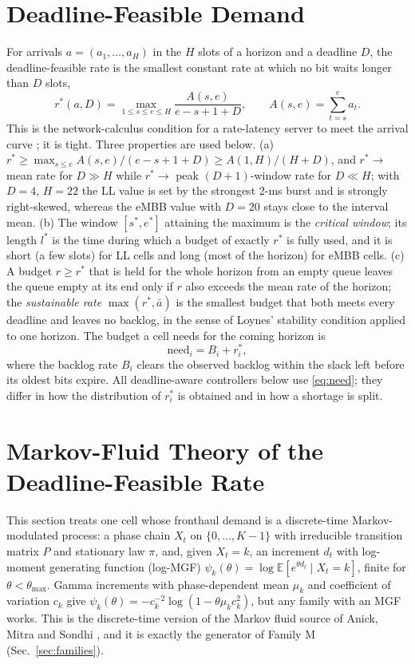 \documentclass[journal]{IEEEtran}
\newcommand{\rstar}{r^{\ast}}
\newcommand{\E}{\mathbb{E}}
\begin{document}
\section{Deadline-Feasible Demand}
\label{sec:demand}
For arrivals $a = (a_1, \dots, a_H)$ in the $H$ slots of a horizon and a deadline $D$, the deadline-feasible rate is the smallest constant rate at which no bit waits longer than $D$ slots,
\begin{equation}
\rstar(a, D) = \max_{1 \le s \le e \le H} \frac{A(s, e)}{e - s + 1 + D}, \qquad A(s, e) = \sum_{t = s}^{e} a_t .
\label{eq:rstar}
\end{equation}
This is the network-calculus condition for a rate-latency server to meet the arrival curve \cite{leboudec2001}; it is tight. Three properties are used below. (a) $\rstar \ge \max_{s \le e} A(s, e)/(e - s + 1 + D) \ge A(1, H)/(H + D)$, and $\rstar \to$ mean rate for $D \gg H$ while $\rstar \to$ peak $(D{+}1)$-window rate for $D \ll H$; with $D = 4$, $H = 22$ the LL value is set by the strongest 2-ms burst and is strongly right-skewed, whereas the eMBB value with $D = 20$ stays close to the interval mean. (b) The window $[s^\ast, e^\ast]$ attaining the maximum is the \emph{critical window}; its length $l^\ast$ is the time during which a budget of exactly $\rstar$ is fully used, and it is short (a few slots) for LL cells and long (most of the horizon) for eMBB cells. (c) A budget $r \ge \rstar$ that is held for the whole horizon from an empty queue leaves the queue empty at its end only if $r$ also exceeds the mean rate of the horizon; the \emph{sustainable rate} $\max(\rstar, \bar a)$ is the smallest budget that both meets every deadline and leaves no backlog, in the sense of Loynes' stability condition \cite{loynes1962} applied to one horizon. The budget a cell needs for the coming horizon is
\begin{equation}
\text{need}_i = B_i + \rstar_i ,
\label{eq:need}
\end{equation}
where the backlog rate $B_i$ clears the observed backlog within the slack left before its oldest bits expire. All deadline-aware controllers below use \eqref{eq:need}; they differ in how the distribution of $\rstar_i$ is obtained and in how a shortage is split.

\section{Markov-Fluid Theory of the Deadline-Feasible Rate}
\label{sec:theory}
This section treats one cell whose fronthaul demand is a discrete-time Markov-modulated process: a phase chain $X_t$ on $\{0, \dots, K-1\}$ with irreducible transition matrix $P$ and stationary law $\pi$, and, given $X_t = k$, an increment $d_t$ with log-moment generating function (log-MGF) $\psi_k(\theta) = \log\E[e^{\theta d_t} \mid X_t = k]$, finite for $\theta < \theta_{\max}$. Gamma increments with phase-dependent mean $\mu_k$ and coefficient of variation $c_k$ give $\psi_k(\theta) = -c_k^{-2}\log(1 - \theta\mu_k c_k^2)$, but any family with an MGF works. This is the discrete-time version of the Markov fluid source of Anick, Mitra and Sondhi \cite{anick1982}, and it is exactly the generator of Family M (Sec.~\ref{sec:families}).
\end{document}
